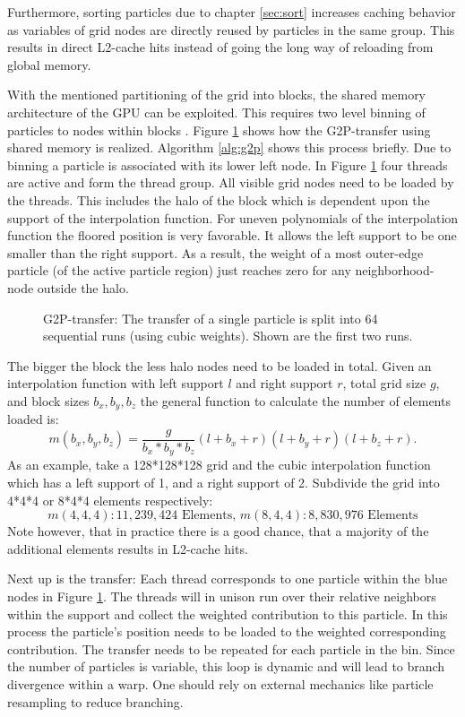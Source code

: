 \documentclass[m,times]{cgMA}
\begin{document}
Furthermore, sorting particles due to chapter \ref{sec:sort} increases caching behavior as variables of grid nodes are directly reused by particles in the same group. This results in direct L2-cache hits instead of going the long way of reloading from global memory.

With the mentioned partitioning of the grid into blocks, the shared memory architecture of the GPU can be exploited. This requires two level binning of particles to nodes within blocks \cite{MPM:GPU}. Figure \ref{fig:g2p_transfer} shows how the G2P-transfer using shared memory is realized. Algorithm \ref{alg:g2p} shows this process briefly. Due to binning a particle is associated with its lower left node. In Figure \ref{fig:g2p_transfer} four threads are active and form the thread group. All visible grid nodes need to be loaded by the threads. This includes the halo of the block which is dependent upon the support of the interpolation function. For uneven polynomials of the interpolation function the floored position is very favorable. It allows the left support to be one smaller than the right support. As a result, the weight of a most outer-edge particle (of the active particle region) just reaches zero for any neighborhood-node outside the halo.

\begin{figure}[htbp]
    \centering
  
  \caption{G2P-transfer: The transfer of a single particle is split into 64 sequential runs (using cubic weights). Shown are the first two runs.}
  \label{fig:g2p_transfer}
\end{figure}
The bigger the block the less halo nodes need to be loaded in total. Given an interpolation function with left support $l$ and right support $r$, total grid size $g$, and block sizes $b_x,b_y,b_z$ the general function to calculate the number of elements loaded is:
\begin{equation}
  m(b_x,b_y,b_z) = \frac{g}{b_x*b_y*b_z}(l+b_x+r)(l+b_y+r)(l+b_z+r).
\end{equation}
 As an example, take a 128*128*128 grid and the cubic interpolation function which has a left support of 1, and a right support of 2. Subdivide the grid into 4*4*4 or 8*4*4 elements respectively:
 $$m(4,4,4): 11,239,424\text{ Elements, }m(8,4,4):  8,830,976\text{ Elements}$$
Note however, that in practice there is a good chance, that a majority of the additional elements results in L2-cache hits.

Next up is the transfer: Each thread corresponds to one particle within the blue nodes in Figure \ref{fig:g2p_transfer}. The threads will in unison run over their relative neighbors within the support and collect the weighted contribution to this particle. In this process the particle's position needs to be loaded to the weighted corresponding contribution. The transfer needs to be repeated for each particle in the bin. Since the number of particles is variable, this loop is dynamic and will lead to branch divergence within a warp. One should rely on external mechanics like particle resampling to reduce branching.
\end{document}
